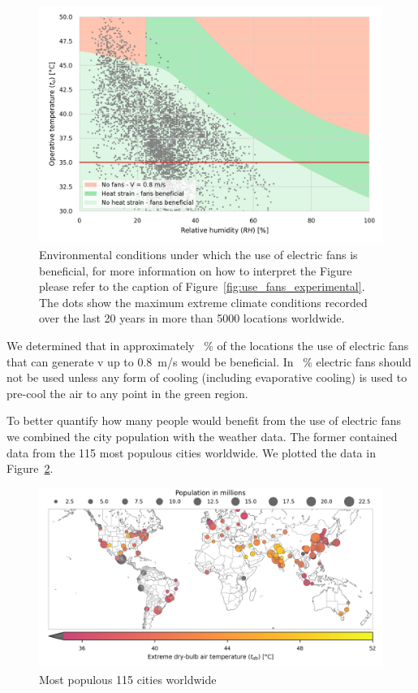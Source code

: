 \begin{figure}[thb!]
    \centering
    \includegraphics[width=\textwidth]{figures/use_fans}
    \caption{Environmental conditions under which the use of electric fans is beneficial, for more information on how to interpret the Figure please refer to the caption of Figure~\ref{fig:use_fans_experimental}.
    The dots show the maximum extreme climate conditions recorded over the last 20 years in more than 5000 locations worldwide.}
    \label{fig:energy_storage_delta}
\end{figure}

We determined that in approximately ~\% of the locations the use of electric fans that can generate \ac{v} up to 0.8~m/s would be beneficial.
In ~\% electric fans should not be used unless any form of cooling (including evaporative cooling) is used to pre-cool the air to any point in the green region.

To better quantify how many people would benefit from the use of electric fans we combined the city population with the weather data.
The former contained data from the 115 most populous cities worldwide.
We plotted the data in Figure~\ref{fig:map-population-temperature}.

\begin{figure}[thb!]
    \centering
    \includegraphics[width=\textwidth]{figures/map-population-temperature}
    \caption{Most populous 115 cities worldwide}
    \label{fig:map-population-temperature}
\end{figure}

